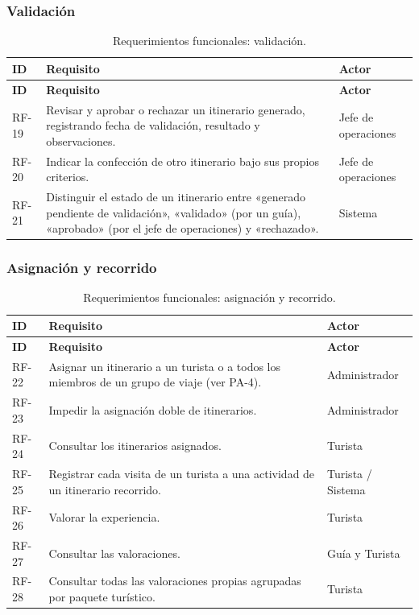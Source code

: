 \documentclass[11pt,a4paper]{article}
\begin{document}
\subsubsection{Validación}
{\footnotesize\setlength{\tabcolsep}{3pt}\renewcommand{\arraystretch}{1.15}
\begin{longtable}{|>{\raggedright\arraybackslash}p{1.28cm}|>{\raggedright\arraybackslash}p{11.28cm}|>{\raggedright\arraybackslash}p{2.98cm}|}
\caption{Requerimientos funcionales: validación.}\label{tab:rf-validacion}\\ \hline
\rowcolor{gray!20} \textbf{ID} & \textbf{Requisito} & \textbf{Actor} \\ \hline
\endfirsthead
\hline \rowcolor{gray!20} \textbf{ID} & \textbf{Requisito} & \textbf{Actor} \\ \hline
\endhead
RF-19 & Revisar y aprobar o rechazar un itinerario generado, registrando fecha de validación, resultado y observaciones. & Jefe de operaciones \\ \hline
RF-20 & Indicar la confección de otro itinerario bajo sus propios criterios. & Jefe de operaciones \\ \hline
RF-21 & Distinguir el estado de un itinerario entre «generado pendiente de validación», «validado» (por un guía), «aprobado» (por el jefe de operaciones) y «rechazado». & Sistema \\ \hline
\end{longtable}}
\vspace{2pt}
\subsubsection{Asignación y recorrido}
{\footnotesize\setlength{\tabcolsep}{3pt}\renewcommand{\arraystretch}{1.15}
\begin{longtable}{|>{\raggedright\arraybackslash}p{1.28cm}|>{\raggedright\arraybackslash}p{11.28cm}|>{\raggedright\arraybackslash}p{2.98cm}|}
\caption{Requerimientos funcionales: asignación y recorrido.}\label{tab:rf-asignacion}\\ \hline
\rowcolor{gray!20} \textbf{ID} & \textbf{Requisito} & \textbf{Actor} \\ \hline
\endfirsthead
\hline \rowcolor{gray!20} \textbf{ID} & \textbf{Requisito} & \textbf{Actor} \\ \hline
\endhead
RF-22 & Asignar un itinerario a un turista o a todos los miembros de un grupo de viaje (ver PA-4). & Administrador \\ \hline
RF-23 & Impedir la asignación doble de itinerarios. & Administrador \\ \hline
RF-24 & Consultar los itinerarios asignados. & Turista \\ \hline
RF-25 & Registrar cada visita de un turista a una actividad de un itinerario recorrido. & Turista / Sistema \\ \hline
RF-26 & Valorar la experiencia. & Turista \\ \hline
RF-27 & Consultar las valoraciones. & Guía y Turista \\ \hline
RF-28 & Consultar todas las valoraciones propias agrupadas por paquete turístico. & Turista \\ \hline
\end{longtable}}
\vspace{2pt}
\end{document}
